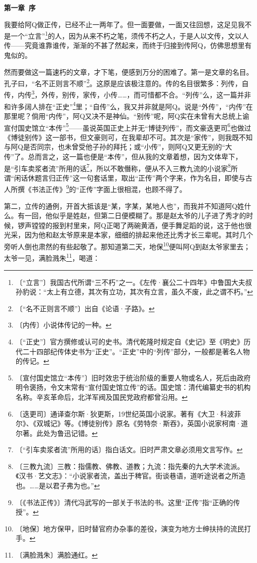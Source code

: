 \documentclass[12pt,UTF-8,openany]{ctexbook}
\begin{document}
\begin{normalsize}
    
    \begin{center}\textbf{第一章~序}\end{center}
    
    我要给阿Q做正传，已经不止一两年了。但一面要做，一面又往回想，这足见我不是一个“立言”\footnote{〔“立言”〕我国古代所谓“三不朽”之一。《左传·襄公二十四年》中鲁国大夫叔孙豹说：“太上有立德，其次有立功，其次有立言，虽久不废，此之谓不朽。”}的人，因为从来不朽之笔，须传不朽之人，于是人以文传，文以人传——究竟谁靠谁传，渐渐的不甚了然起来，而终于归接到传阿Q，仿佛思想里有鬼似的。
    
    然而要做这一篇速朽的文章，才下笔，便感到万分的困难了。第一是文章的名目。孔子曰，“名不正则言不顺”\footnote{〔“名不正则言不顺”〕出自《论语·子路》。}。这原是应该极注意的。传的名目很繁多：列传，自传，内传\footnote{〔内传〕小说体传记的一种。}，外传，别传，家传，小传……，而可惜都不合。“列传”么，这一篇并非和许多阔人排在“正史”\footnote{〔“正史”〕官方撰修或认可的史书。清代乾隆时规定自《史记》至《明史》历代二十四部纪传体史书为“正史”。“正史”中的“列传”部分，一般都是著名人物的传记。}里；“自传”么，我又并非就是阿Q。说是“外传”，“内传”在那里呢？倘用“内传”，阿Q又决不是神仙。“别传”呢，阿Q实在未曾有大总统上谕宣付国史馆立“本传”\footnote{〔宣付国史馆立“本传”〕旧时效忠于统治阶级的重要人物或名人，死后由政府明令褒扬，令文末常有“宣付国史馆立传”的话。国史馆：清代编纂史书的机构名称。辛亥革命后，北洋军阀及国民党政府都曾沿用。}——虽说英国正史上并无“博徒列传”，而文豪迭更司\footnote{〔迭更司〕通译查尔斯·狄更斯，19世纪英国小说家。著有《大卫·科波菲尔》、《双城记》等。《博徒别传》原名《劳特奈·斯吞》，英国小说家柯南·道尔著。此处为鲁迅记错。}也做过《博徒别传》这一部书，但文豪则可，在我辈却不可。其次是“家传”，则我既不知与阿Q是否同宗，也未曾受他子孙的拜托；或“小传”，则阿Q又更无别的“大传”了。总而言之，这一篇也便是“本传”，但从我的文章着想，因为文体卑下，是“引车卖浆者流”所用的话\footnote{〔“引车卖浆者流”所用的话〕指白话文。旧时严肃文章必须用文言写作。}，所以不敢僭称，便从不入三教九流的小说家\footnote{〔三教九流〕三教：指儒教、佛教、道教；九流：指先秦的九大学术流派。《汉书·艺文志》：“小说家者流，盖出于稗官。街谈巷语，道听途说者之所造也。……是以君子弗为也。”}所谓“闲话休题言归正传”这一句套话里，取出“正传”两个字来，作为名目，即使与古人所撰《书法正传》\footnote{〔《书法正传》〕清代冯武写的一部关于书法的书。这里“正传”指“正确的传授”。}的“正传”字面上很相混，也顾不得了。
    
    第二，立传的通例，开首大抵该是“某，字某，某地人也”，而我并不知道阿Q姓什么。有一回，他似乎是姓赵，但第二日便模糊了。那是赵太爷的儿子进了秀才的时候，锣声镗镗的报到村里来，阿Q正喝了两碗黄酒，便手舞足蹈的说，这于他也很光采，因为他和赵太爷原来是本家，细细的排起来他还比秀才长三辈呢。其时几个旁听人倒也肃然的有些起敬了。那知道第二天，地保\footnote{〔地保〕地方保甲，旧时替官府办杂事的差役，演变为地方士绅扶持的流民打手。}便叫阿Q到赵太爷家里去；太爷一见，满脸溅朱\footnote{〔满脸溅朱〕满脸通红。}，喝道：
    

\end{normalsize}
\end{document}
